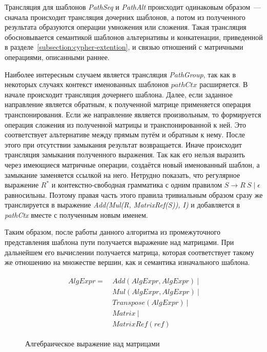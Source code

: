 Трансляция для шаблонов \textit{PathSeq} и \textit{PathAlt} происходит одинаковым образом~--- сначала происходит трансляция дочерних шаблонов, а потом из полученного результата образуются операции умножения или сложения. Такая трансляция обосновывается семантикой шаблонов альтернативы и конкатенации, приведенной в разделе~\ref{subsection:cypher-extention}, и связью отношений с матричными операциями, описанными раннее.

Наиболее интересным случаем является трансляция \textit{Path\-Group}, так как в некоторых случаях контекст именованных шаблонов $pathCtx$ расширяется. В начале происходит трансляция дочернего шаблона. Далее, если заданное направление является обратным, к полученной матрице применяется операция транспонирования. Если же направление является произвольным, то формируется операция сложения из полученной матрицы и транспонированной к ней. Это соответствует альтернативе между прямым путём и обратным к нему. После этого при отсутствии замыкания результат возвращается. Иначе происходит трансляция замыкания полученного выражения. Так как его нельзя выразить через имеющиеся матричные операции, создаётся новый именованный шаблон, а замыкание заменяется ссылкой на него. Нетрудно показать, что регулярное выражение $R^*$ и контекстно-свободная грамматика с одним правилом $S \rightarrow R~S \mid \epsilon$ равносильны. Поэтому правая часть этого правила тривиальным образом сразу же транслируется в выражение \textit{Add(Mul(R, MatrixRef(S)), I)} и добавляется в \textit{pathCtx} вместе с полученным новым именем.

Таким образом, после работы данного алгоритма из промежуточного представления шаблона пути получается выражение над матрицами. При дальнейшем его вычислении получается матрица, которая соответствует такому же отношению на множестве вершин, как и семантика изначального шаблона.



\begin{figure}[H]
\begin{align*}
\begin{split}
AlgExpr= ~ &Add(AlgExpr, AlgExpr)~|\\
           &Mul(AlgExpr, AlgExpr)~|\\
           &Transpose(AlgExpr)~|\\
           &Matrix~|\\
           &MatrixRef(ref)
\end{split}
\end{align*}
\caption{Алгебраическое выражение над матрицами}
\label{fig:alg-expr}
\end{figure}


